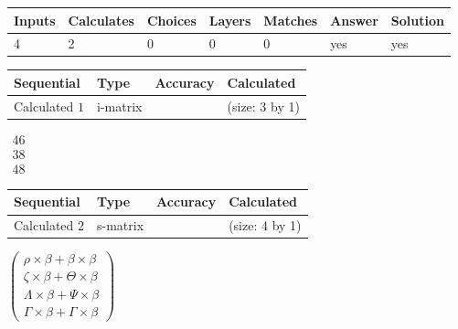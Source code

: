 \documentclass[12pt]{article}
\begin{document}
 

 
 
\noindent{}
 
 

 
\vspace{0.3in}
   
   
   
   
\noindent\begin{tabular}{|l|l|l|l|l|l|l|}
 \hline
Inputs & Calculates & Choices & Layers & Matches & Answer & Solution \\ \hline
           4 & 
           2 & 
           0
  & 
           0 & 
           0 & 
  yes & 
  yes 
  \\ \hline
 \end{tabular}
   
   
   
   
\noindent{}
   
   
  
  
\noindent\begin{tabular}{|l|l|l|l|}
\hline
 Sequential & Type & Accuracy & Calculated \\ 
\hline
 
 
  Calculated $           1$ & i-matrix &  & 
 (size:           3 by           1)
 \\  \hline  
 \end{tabular}
   
   
$\begin{array}{
 c
 }
          46 \\ 
          38 \\ 
          48
 \end{array}  $ 
  
  
\noindent\begin{tabular}{|l|l|l|l|}
\hline
 Sequential & Type & Accuracy & Calculated \\ 
\hline
 
 
  Calculated $           2$ & s-matrix & & 
 (size:           4 by           1)
 \\  \hline  
 \end{tabular}
   
   
 $   \left( \begin{array}
 {
 c
 }
 \rho \times  \beta   +  \beta \times  \beta \\ 
                    \zeta \times  \beta   +  \Theta \times  \beta \\ 
 \Lambda \times  \beta   +  \Psi \times  \beta \\ 
 \Gamma \times  \beta   +  \Gamma \times  \beta
 \end{array} \right) $ 
   
\end{document}

